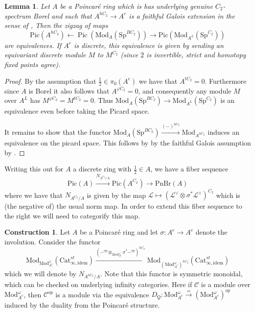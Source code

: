 \documentclass{article}
\DeclareMathOperator{\Pic}{Pic} %
\renewcommand{\phi}{\varphi}
\newcommand{\pnbr}{\ensuremath{\mathrm{PnBr}}}
\newcommand{\pic}{\ensuremath{\mathrm{Pic}}}
\newtheorem{lemma}[equation]{Lemma}
\theoremstyle{definition}
\newtheorem{construction}[equation]{Construction}
\begin{document}
\begin{lemma}
    Let $A$ be a Poincar{\'e} ring which is has underlying genuine $C_2$-spectrum Borel and such that $A^{hC_2}\to A^e$ is a faithful Galois extension in the sense of \cite{Rognes_galois}, Then the zigzag of maps \[\pic(A^{hC_2})\leftarrow \Pic(\mathrm{Mod}_{A}(\mathrm{Sp}^{BC_2}))\rightarrow \pic(\mathrm{Mod}_{A^L}(\mathrm{Sp}^{C_2}))\] are equivalences. 
    If $A^e$ is discrete, this equivalence is given by sending an equivariant discrete module $M$ to $M^{C_2}$ (since $ 2 $ is invertible, strict and homotopy fixed points agree).
\end{lemma}
\begin{proof}
    By the assumption that $\frac{1}{2}\in \pi_0(A^e)$ we have that $A^{tC_2}=0$. Furthermore since $A$ is Borel it also follows that $A^{\phi C_2}=0$, and consequently any module $M$ over $A^L$ has $M^{\phi C_2}=M^{tC_2}=0$. Thus $\mathrm{Mod}_A(\mathrm{Sp}^{BC_2})\to \mathrm{Mod}_{A^L}(\mathrm{Sp}^{C_2})$ is an equivalence even before taking the Picard space.

    It remains to show that the functor $\mathrm{Mod}_A(\mathrm{Sp}^{BC_2})\xrightarrow{(-)^{hC_2}}\mathrm{Mod}_{A^{hC_2}}$ induces an equivalence on the picard space. This follows by by the faithful Galois assumption by \cite[Proposition 9.4]{Mathew_galois}.
\end{proof}

Writing this out for $A$ a discrete ring with $\frac{1}{2}\in A$, we have a fiber sequence \[\pic(A)\xrightarrow{N_{A^{C_2}/A}}\pic(A^{C_2})\to \pnbr(A)\] where we have that $N_{A^{C_2}/A}$ is given by the map $\mathcal{L}\mapsto (\mathcal{L}^{\vee}\otimes \sigma^*\mathcal{L}^\vee)^{C_2}$ which is (the negative of) the usual norm map. In order to extend this fiber sequence to the right we will need to categorify this map.
	
	\begin{construction}
		Let $A$ be a Poincar{\'e} ring and let $\sigma: A^e\to A^e$ denote the involution. Consider the functor \[\mathrm{Mod}_{\mathrm{Mod}_{A^{e}}^\omega}(\mathrm{Cat}_{\infty, \textrm{idem}}^{st})\xrightarrow{\left(-^{op}\otimes_{\mathrm{Mod}_{A^e}^\omega} \sigma^*-^{op}\right)^{hC_2}}\mathrm{Mod}_{(\mathrm{Mod}_{A^e}^\omega)^{hC_2}}(\mathrm{Cat}_{\infty, \textrm{idem}}^{st})\] which we will denote by $N_{A^{hC_2}/A}$. Note that this functor is symmetric monoidal, which can be checked on underlying infinity categories. Here if $\mathcal{C}$ is a module over $\mathrm{Mod}_{A^e}^{\omega}$, then $\mathcal{C}^{op}$ is a module via the equivalence $D_\Qoppa:\mathrm{Mod}_{A^e}^\omega\xrightarrow{\simeq}(\mathrm{Mod}_{A^e}^\omega)^{op}$ induced by the duality from the Poincar{\'e} structure. 
	\end{construction}
	
\end{document}
